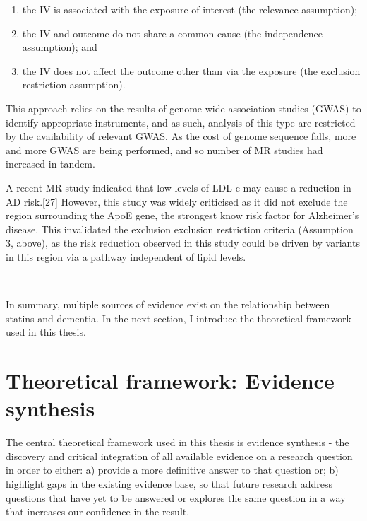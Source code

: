 \documentclass[a4paper, twoside]{templates/ociamthesis}
\providecommand{\tightlist}{%
  \setlength{\itemsep}{0pt}\setlength{\parskip}{0pt}}
\begin{document}
\begin{enumerate}
\def\labelenumi{\arabic{enumi}.}
\tightlist
\item
  the IV is associated with the exposure of interest (the relevance assumption);
\item
  the IV and outcome do not share a common cause (the independence assumption); and
\item
  the IV does not affect the outcome other than via the exposure (the exclusion restriction assumption).
\end{enumerate}

This approach relies on the results of genome wide association studies (GWAS) to identify appropriate instruments, and as such, analysis of this type are restricted by the availability of relevant GWAS. As the cost of genome sequence falls, more and more GWAS are being performed, and so number of MR studies had increased in tandem.





A recent MR study indicated that low levels of LDL-c may cause a reduction in AD risk.{[}27{]} However, this study was widely criticised as it did not exclude the region surrounding the ApoE gene, the strongest know risk factor for Alzheimer's disease. This invalidated the exclusion exclusion restriction criteria (Assumption 3, above), as the risk reduction observed in this study could be driven by variants in this region via a pathway independent of lipid levels.

~

In summary, multiple sources of evidence exist on the relationship between statins and dementia. In the next section, I introduce the theoretical framework used in this thesis.

\hypertarget{theoretical-framework-evidence-synthesis}{%
\section{Theoretical framework: Evidence synthesis}\label{theoretical-framework-evidence-synthesis}}

The central theoretical framework used in this thesis is evidence synthesis - the discovery and critical integration of all available evidence on a research question in order to either: a) provide a more definitive answer to that question or; b) highlight gaps in the existing evidence base, so that future research address questions that have yet to be answered or explores the same question in a way that increases our confidence in the result.
\end{document}
